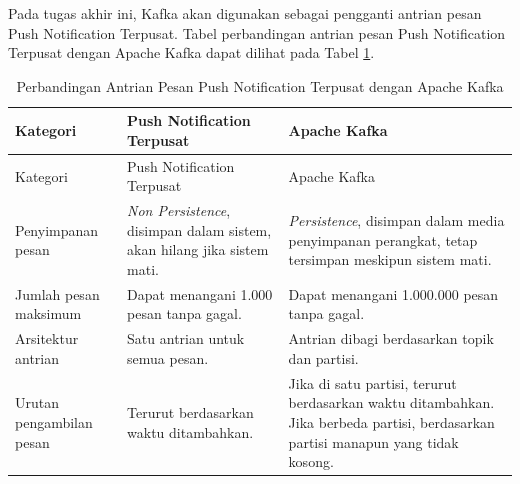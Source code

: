 \par Pada tugas akhir ini, Kafka akan digunakan sebagai pengganti antrian pesan Push Notification Terpusat. Tabel perbandingan antrian pesan Push Notification Terpusat dengan Apache Kafka dapat dilihat pada Tabel \ref{t:perbandingan_kafka}.
\begin{longtable}{|p{2.5cm}|p{3.5cm}|p{3.5cm}|}
	\caption{Perbandingan Antrian Pesan Push Notification Terpusat dengan Apache Kafka} \label{t:perbandingan_kafka} \\ \hline
	\rowcolor{lightgray} Kategori & Push Notification Terpusat & Apache Kafka \\ \hline
	\endfirsthead
	\hline
	\rowcolor{lightgray} Kategori & Push Notification Terpusat & Apache Kafka \\ \hline
	\endhead
	Penyimpanan pesan & \textit{Non Persistence}, disimpan dalam sistem, akan hilang jika sistem mati. & \textit{Persistence}, disimpan dalam media penyimpanan perangkat, tetap tersimpan meskipun sistem mati. \\ \hline
	Jumlah pesan maksimum & Dapat menangani 1.000 pesan tanpa gagal. & Dapat menangani 1.000.000 pesan tanpa gagal. \\ \hline
	Arsitektur antrian & Satu antrian untuk semua pesan. & Antrian dibagi berdasarkan topik dan partisi. \\ \hline
	Urutan pengambilan pesan & Terurut berdasarkan waktu ditambahkan. & Jika di satu partisi, terurut berdasarkan waktu ditambahkan. Jika berbeda partisi, berdasarkan partisi manapun yang tidak kosong. \\ \hline
\end{longtable}


